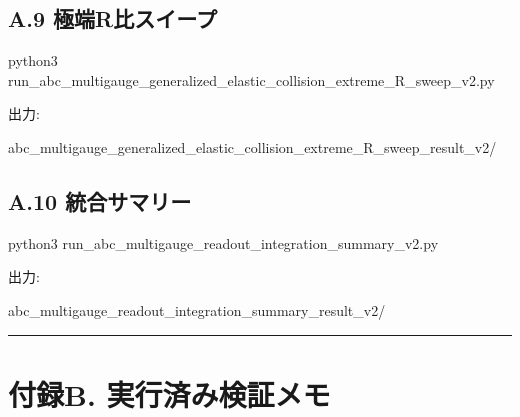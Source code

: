 \documentclass[
  a4paper,
]{article}
\newenvironment{Shaded}{}{}
\newcommand{\NormalTok}[1]{#1}
\begin{document}
\subsection{A.9
極端R比スイープ}\label{a.9-ux6975ux7aefrux6bd4ux30b9ux30a4ux30fcux30d7}

\begin{Shaded}
\begin{Highlighting}[]
\NormalTok{python3 run\_abc\_multigauge\_generalized\_elastic\_collision\_extreme\_R\_sweep\_v2.py}
\end{Highlighting}
\end{Shaded}

出力:

\begin{Shaded}
\begin{Highlighting}[]
\NormalTok{abc\_multigauge\_generalized\_elastic\_collision\_extreme\_R\_sweep\_result\_v2/}
\end{Highlighting}
\end{Shaded}

\subsection{A.10
統合サマリー}\label{a.10-ux7d71ux5408ux30b5ux30deux30eaux30fc}

\begin{Shaded}
\begin{Highlighting}[]
\NormalTok{python3 run\_abc\_multigauge\_readout\_integration\_summary\_v2.py}
\end{Highlighting}
\end{Shaded}

出力:

\begin{Shaded}
\begin{Highlighting}[]
\NormalTok{abc\_multigauge\_readout\_integration\_summary\_result\_v2/}
\end{Highlighting}
\end{Shaded}

\begin{center}\rule{0.5\linewidth}{0.5pt}\end{center}

\section{付録B.
実行済み検証メモ}\label{ux4ed8ux9332b.-ux5b9fux884cux6e08ux307fux691cux8a3cux30e1ux30e2}
\end{document}
